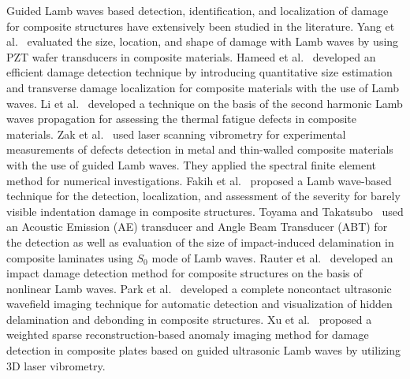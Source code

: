 \documentclass[b5paper, 11pt, titlepage]{book}
\begin{document}
Guided Lamb waves based detection, identification, and localization of damage for composite structures have extensively been studied in the literature. Yang et al.~\cite{Yang2019} evaluated the size, location, and shape of damage with Lamb waves by using PZT wafer transducers in composite materials. Hameed et al.~\cite{Hameed2019b} developed an efficient damage detection technique by introducing quantitative size estimation and transverse damage localization for composite materials with the use of Lamb waves. Li et al.~\cite{Li2012} developed a technique on the basis of the second harmonic Lamb waves propagation for assessing the thermal fatigue defects in composite materials. Zak et al.~\cite{Zak2012} used laser scanning vibrometry for experimental measurements of defects detection in metal and thin-walled composite materials with the use of guided Lamb waves. They applied the spectral finite element method for numerical investigations. Fakih et al.~\cite{Fakih2019} proposed a Lamb wave-based technique for the detection, localization, and assessment of the severity for barely visible indentation damage in composite structures. Toyama and Takatsubo~\cite{Toyama2004} used an Acoustic Emission (AE) transducer and Angle Beam Transducer (ABT) for the detection as well as evaluation of the size of impact-induced delamination in composite laminates using $S_0$ mode of Lamb waves. Rauter et al.~\cite{Rauter2015} developed an impact damage detection method for composite structures on the basis of nonlinear Lamb waves. Park et al.~\cite{Park2014} developed a complete noncontact ultrasonic wavefield imaging technique for automatic detection and visualization of hidden delamination and debonding in composite structures. Xu et al.~\cite{Staszewski2009} proposed a weighted sparse reconstruction-based anomaly imaging method for damage detection in composite plates based on guided ultrasonic Lamb waves by utilizing 3D laser vibrometry. 
\end{document}
